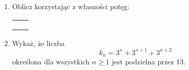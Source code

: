 \documentclass[12pt,a4paper]{article}
\begin{document}
\begin{enumerate}[1.]
	\item Oblicz korzystając z własności potęg:
	
	\begin{enumerate}[a)] \begin{tabular}{p{7cm} p{7cm}}
			\item $\frac{3^3\cdot3^6+(3^3)^3}{3^8}=$& \vspace{0.4cm}\item $\frac{8^4:(2^7)^{-2}-4^{12}}{2^{24}}=$ \\
			\item $\frac{(2^2)^3-2^8:4^2}{8}=$& \item$\frac{2^{102}+2^{103}+2^{104}}{3\cdot4^{25}}=$ \\
			\item $(a^7:(a^3)^{-2})^{-1}\cdot(a^{-7}\cdot a^5)^2=$& \item$(3^7\cdot\frac{1}{9}^3)^{-3}:(\frac{1}{3}^7:\frac{1}{27})^{4}=$ \\
	\end{tabular} \end{enumerate}
	
	
	\item Wykaż, że liczba 
	$$k_n = 3^n+3^{n+1}+3^{n+2}$$
		określona dla wszystkich $n\geq1$ jest podzielna przez 13.
		

\end{enumerate}
\end{document}
